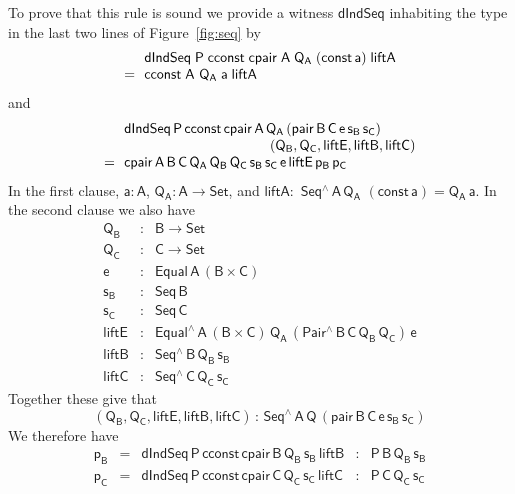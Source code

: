 \documentclass[sigplan,10pt]{acmart}
\begin{document}
To prove that this rule is sound we provide a witness
$\mathsf{dIndSeq}$ inhabiting the type in the last two lines of
Figure~\ref{fig:seq} by
\[\begin{array}{ll}
& \!\!\mathsf{dIndSeq\;P\;cconst\;cpair\;A\;Q_A\;(const\,a)\;liftA}\\
= & \!\!\mathsf{cconst\;A}$ $\mathsf{Q_A\;a\;liftA}
\end{array}\]
and
\[\begin{array}{ll}
 &\!\!\mathsf{dIndSeq\,P\,cconst\,cpair\,A\,Q_A\,(pair\,B\,C\,e\,s_B\,s_C)}\\
 & \hspace*{1.4in}\mathsf{(Q_B, Q_C, liftE, liftB, liftC)}\\
= &\!\! \mathsf{cpair\,A\,B\,C\,Q_A\,Q_B\,Q_C\,s_B\,s_C\,e\,liftE\,
  p_B\,p_C}
\end{array}\]
In the first clause, $\mathsf{a : A}$, $\mathsf{Q_A : A \to Set}$, and
$\mathsf{liftA :}$ $\mathsf{Seq^{\wedge}\,A\,Q_A}$ $\mathsf{(const\,a)
  = Q_A\,a}$. In the second clause we also have
\[\begin{array}{lll}
\mathsf{Q_B} & : & \mathsf{B \to Set}\\
\mathsf{Q_C} & : & \mathsf{C \to Set}\\
\mathsf{e}  & : & \mathsf{Equal\,A\,(B \times C)}\\
\mathsf{s_B} & : & \mathsf{Seq\,B}\\
\mathsf{s_C} & : & \mathsf{Seq\,C}\\
\mathsf{liftE} & : & \mathsf{Equal^{\wedge}\,A\, (B \times C)\, Q_A\,
  (Pair^\wedge \,B\,C\,Q_B\,Q_C) \, e}\\
\mathsf{liftB} & : & \mathsf{Seq^{\wedge}\,B\,Q_B\,s_B}\\
\mathsf{liftC} & : & \mathsf{Seq^{\wedge}\,C\,Q_C\,s_C}
\end{array}\]
Together these give that
\[\mathsf{(Q_B, Q_C, liftE,liftB, liftC)
\, :\,  Seq^{\wedge}\,A\,Q\,(pair\,B\,C\,e\,s_B\,s_C)}\]
We therefore have
\[\begin{array}{lllll}
\mathsf{p_B}\!\! & = & \!\!\mathsf{dIndSeq\,P
  \,cconst\,cpair\,B\,Q_B\,s_B\,liftB} \!\! & : & 
\!\!\mathsf{P\,B\,Q_B\,s_B}\\
\mathsf{p_C}\!\! & = & \!\!\mathsf{dIndSeq\,P\,
  cconst\,cpair\,C\,Q_C\,s_C\,liftC}\!\! & : &\!\! \mathsf{P\,C\,Q_C\,s_C} 
\end{array}\]
\end{document}
